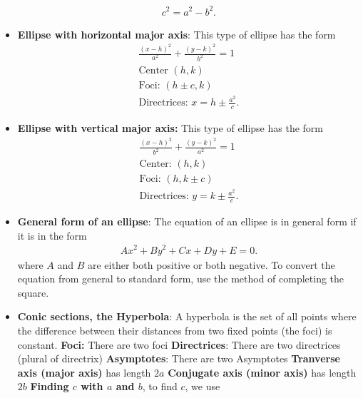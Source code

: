 \documentclass{report}
\begin{document}
\begin{itemize}
\begin{align*}
            c^{2} =  a^{2} - b^{2}
        .\end{align*}
    \item \textbf{Ellipse with horizontal major axis}: This type of ellipse has the form
        \begin{align*}
            \frac{(x-h)^{2}}{a^{2}} + \frac{(y-k)^{2}}{b^{2}} = 1 \\
            \text{Center } (h,k) \\
            \text{Foci: } (h\pm c, k) \\
            \text{Directrices: } x=h\pm \frac{a^{2}}{c}
        .\end{align*}
    \item \textbf{Ellipse with vertical major axis:} This type of ellipse has the form
        \begin{align*}
             \frac{(x-h)^{2}}{b^{2}} + \frac{(y-k)^{2}}{a^{2}} = 1 \\
            \text{Center: } (h,k) \\
            \text{Foci: } (h, k\pm c) \\
            \text{Directrices: } y=k\pm \frac{a^{2}}{c}
        .\end{align*}
    \item \textbf{General form of an ellipse}: The equation of an ellipse is in general form if it is in the form
        \begin{align*}
            Ax^{2} +By^{2}   +Cx +Dy  +E = 0
        .\end{align*}
        where $A$ and $B$ are either both positive or both negative. To convert the equation from general to standard form, use the method of completing the square.
    \item \textbf{Conic sections, the Hyperbola}: A hyperbola is the set of all points where the difference between their distances from two fixed points (the foci) is constant.
        \bigbreak \noindent 
        \bigbreak \noindent 
        \textbf{Foci:} There are two foci
        \smallbreak \noindent
        \textbf{Directrices}: There are two directrices (plural of directrix)
        \smallbreak \noindent
        \textbf{Asymptotes}:  There are two Asymptotes
        \smallbreak \noindent
        \textbf{Tranverse axis (major axis)} has length $2a$
        \smallbreak \noindent
        \textbf{Conjugate axis (minor axis)} has length $2b$
        \smallbreak \noindent
        \textbf{Finding $c$ with $a$ and $b$}, to find $c$, we use
        \begin{align*}

\end{align*}
\end{itemize}
\end{document}
